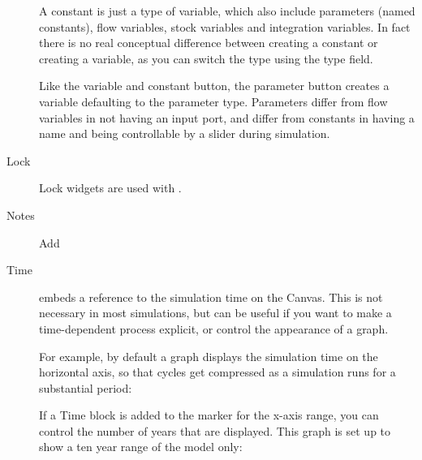 \begin{description}
A constant is just a type of variable, which also include parameters
(named constants), flow variables, stock variables and integration
variables. In fact there is no real conceptual difference between
creating a constant or creating a variable, as you can switch the type
using the type field.

Like the variable and constant button, the parameter button creates a
variable defaulting to the parameter type. Parameters differ from flow
variables in not having an input port, and differ from constants in
having a name and being controllable by a slider during simulation.

\item[Lock] Lock widgets are used with .
\item[Notes] Add 

\item[Time]  embeds a reference to the
simulation time on the Canvas. This is not necessary in most
simulations, but can be useful if you want to make a time-dependent
process explicit, or control the appearance of a graph. 

For example, by default a graph displays the simulation time on the
horizontal axis, so that cycles get compressed as a simulation runs
for a substantial period:

\begin{center}
\end{center}

If a Time block is added to the marker for the x-axis range, you can
control the number of years that are displayed. This graph is set up
to show a ten year range of the model only: 


\end{description}

